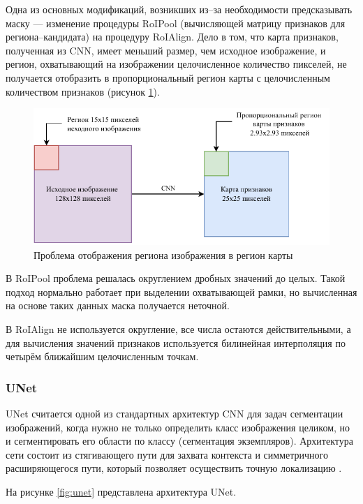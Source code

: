 Одна из основных модификаций, возникших из--за необходимости предсказывать маску --- изменение процедуры RoIPool (вычисляющей матрицу признаков для региона--кандидата) на процедуру RoIAlign. Дело в том, что карта признаков, полученная из CNN, имеет меньший размер, чем исходное изображение, и регион, охватывающий на изображении целочисленное количество пикселей, не получается отобразить в пропорциональный регион карты с целочисленным количеством признаков (рисунок \ref{fig:maskrcnn}). 

\begin{figure}[H]
	\centering
	\includegraphics[width=\textwidth]{img/maskrcnn.pdf}
	\caption{Проблема отображения региона изображения в регион карты}
	\label{fig:maskrcnn}
\end{figure}

В RoIPool проблема решалась округлением дробных значений до целых. Такой подход нормально работает при выделении охватывающей рамки, но вычисленная на основе таких данных маска получается неточной.

В RoIAlign не используется округление, все числа остаются действительными, а для вычисления значений признаков используется билинейная интерполяция по четырём ближайшим целочисленным точкам.

\subsubsection{UNet}

UNet считается одной из стандартных архитектур CNN для задач сегментации изображений, когда нужно не только определить класс изображения целиком, но и сегментировать его области по классу (сегментация экземпляров). Архитектура сети состоит из стягивающего пути для захвата контекста и симметричного расширяющегося пути, который позволяет осуществить точную локализацию \cite{unet}.

На рисунке \ref{fig:unet} представлена архитектура UNet.

